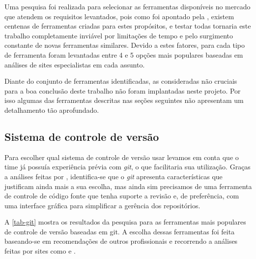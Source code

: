 \documentclass[
12pt,				%
openright,			%
oneside,			%
a4paper,			%
english,			%
french,				%
spanish,			%
brazil,				%
]{abntex2}
\begin{document}
Uma pesquisa foi realizada para selecionar as ferramentas disponíveis no mercado que atendem os requisitos levantados, pois como foi apontado pela , existem centenas de ferramentas criadas para estes propósitos, e testar todas tornaria este trabalho completamente inviável por limitações de tempo e pelo surgimento constante de novas ferramentas similares. Devido a estes fatores, para cada tipo de ferramenta foram levantadas entre 4 e 5 opções mais populares baseadas em análises de sites especialistas em cada assunto.

Diante do conjunto de ferramentas identificadas, as consideradas não cruciais para a boa conclusão deste trabalho não foram implantadas neste projeto. Por isso algumas das ferramentas descritas nas seções seguintes não apresentam um detalhamento tão aprofundado.

\subsection{Sistema de controle de versão}

Para escolher qual sistema de controle de versão usar levamos em conta que o time já possuía experiência prévia com \textit{git}, o que facilitaria sua utilização. Graças a análises feitas por , identifica-se que o \textit{git} apresenta características que justificam ainda mais a sua escolha, mas ainda sim precisamos de uma ferramenta de controle de código fonte que tenha suporte a revisão e, de preferência, com uma interface gráfica para simplificar a gerência dos repositórios.

A \autoref{tab-git} mostra os resultados da pesquisa para as ferramentas mais populares de controle de versão baseadas em git. A escolha dessas ferramentas foi feita baseando-se em recomendações de outros profissionais e recorrendo a análises feitas por sites como  e .
\end{document}
